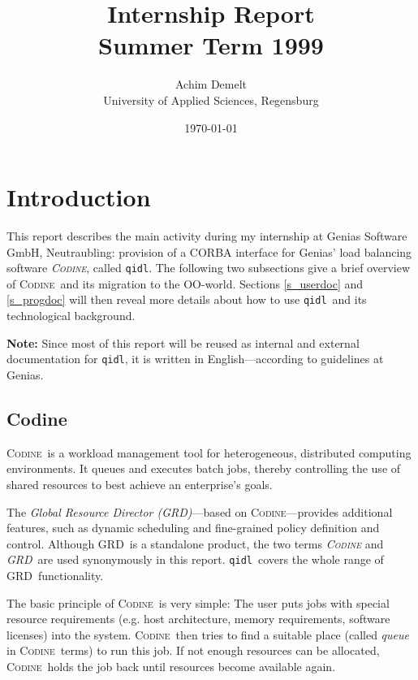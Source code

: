 \documentclass[a4paper, titlepage, twoside]{article}
\newcommand{\qidl}{{\tt qidl}}
\newcommand{\codine}{\textsc{Codine}}
\newcommand{\GRD}{\textsc{GRD}}
\begin{document}
\title{\Huge\bf Internship Report \\ \Large Summer Term 1999}
\author{Achim Demelt \\ University of Applied Sciences, Regensburg}
\date{\today}

\maketitle
\cleardoublepage
\tableofcontents
\vfill
\listoffigures
\cleardoublepage

\pagestyle{fancy}

\section{\label{s_intro}Introduction}
This report describes the main activity during my internship at Genias
Software GmbH, Neutraubling: provision of a CORBA
interface for Genias' load balancing software \textsl{\codine}, called 
\qidl. The following
two subsections give a brief overview of \codine\ and its migration to the
OO-world. Sections \ref{s_userdoc} and \ref{s_progdoc} will then reveal more
details about how to use \qidl\ and its technological background.

\textbf{Note:} Since most of this report will be reused as internal and 
external documentation for \qidl, it is written in English---according 
to guidelines at Genias.

\subsection{\label{s_Codine}Codine}
\codine\ is a workload management tool for heterogeneous, distributed computing
environments. It queues and executes batch jobs, thereby controlling the use
of shared resources to best achieve an enterprise's goals.

The \textsl{Global Resource Director (\GRD)}---based on \codine---provides
additional features, such as dynamic scheduling and fine-grained policy
definition and control. Although \GRD\ is a standalone product, the two terms
\textsl{\codine} and \textsl{\GRD}\ are used synonymously in this report. \qidl\
covers the whole range of \GRD\ functionality.

The basic principle of \codine\ is very simple: The user puts jobs with special
resource requirements (e.g. host architecture, memory requirements, software
licenses) into the system. \codine\ then tries to find a suitable place (called
\textsl{queue} in \codine\ terms) to run this job. If not enough resources can
be allocated, \codine\  holds the job back until resources become available
again.
\end{document}
